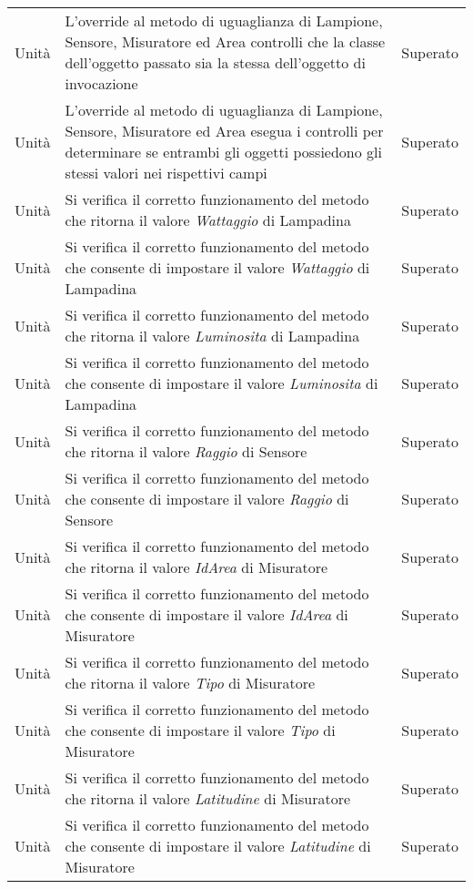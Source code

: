\begin{center}
\begin{xltabular}{\linewidth}{|l|X|l|}
        Unità & L'override al metodo di uguaglianza di Lampione, Sensore, Misuratore ed Area controlli che la classe dell'oggetto passato sia la stessa dell'oggetto di invocazione & Superato\\
        Unità & L'override al metodo di uguaglianza di Lampione, Sensore, Misuratore ed Area esegua i controlli per determinare se entrambi gli oggetti possiedono gli stessi valori nei rispettivi campi & Superato\\
        Unità & Si verifica il corretto funzionamento del metodo che ritorna il valore \textit{Wattaggio} di Lampadina & Superato\\
        Unità & Si verifica il corretto funzionamento del metodo che consente di impostare il valore \textit{Wattaggio} di Lampadina & Superato\\
        Unità & Si verifica il corretto funzionamento del metodo che ritorna il valore \textit{Luminosita} di Lampadina & Superato\\
        Unità & Si verifica il corretto funzionamento del metodo che consente di impostare il valore \textit{Luminosita} di Lampadina & Superato\\
        Unità & Si verifica il corretto funzionamento del metodo che ritorna il valore \textit{Raggio} di Sensore & Superato\\
        Unità & Si verifica il corretto funzionamento del metodo che consente di impostare il valore \textit{Raggio} di Sensore & Superato\\
        Unità & Si verifica il corretto funzionamento del metodo che ritorna il valore \textit{IdArea} di Misuratore & Superato\\
        Unità & Si verifica il corretto funzionamento del metodo che consente di impostare il valore \textit{IdArea} di Misuratore & Superato\\
        Unità & Si verifica il corretto funzionamento del metodo che ritorna il valore \textit{Tipo} di Misuratore & Superato\\
        Unità & Si verifica il corretto funzionamento del metodo che consente di impostare il valore \textit{Tipo} di Misuratore & Superato\\
        Unità & Si verifica il corretto funzionamento del metodo che ritorna il valore \textit{Latitudine} di Misuratore & Superato\\
        Unità & Si verifica il corretto funzionamento del metodo che consente di impostare il valore \textit{Latitudine} di Misuratore & Superato\\

\end{xltabular}
\end{center}
